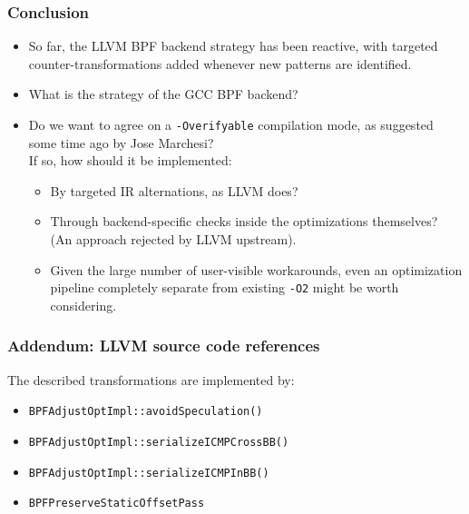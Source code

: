 \documentclass{beamer}
\newcommand{\code}[1]{\texttt{#1}}
\begin{document}
\begin{frame}
\frametitle{Conclusion}
\begin{itemize}
\item So far, the LLVM BPF backend strategy has been reactive, with
  targeted counter-transformations added whenever new patterns are
  identified.
\item What is the strategy of the GCC BPF backend?
\item Do we want to agree on a \code{-Overifyable} compilation mode,
  as suggested some time ago by Jose Marchesi? \\
  If so, how should it be implemented:
  \begin{itemize}
  \item By targeted IR alternations, as LLVM does?
  \item Through backend-specific checks inside the optimizations themselves?\\
    (An approach rejected by LLVM upstream).

  \item Given the large number of user-visible workarounds, even an
    optimization pipeline completely separate from existing \code{-O2}
    might be worth considering.
  \end{itemize}
\end{itemize}
\end{frame}

\begin{frame}
  \frametitle{Addendum: LLVM source code references}

  The described transformations are implemented by:
  \begin{itemize}
  \item \code{BPFAdjustOptImpl::avoidSpeculation()}
  \item \code{BPFAdjustOptImpl::serializeICMPCrossBB()}
  \item \code{BPFAdjustOptImpl::serializeICMPInBB()}
  \item \code{BPFPreserveStaticOffsetPass}
  \end{itemize}
\end{frame}
\end{document}
